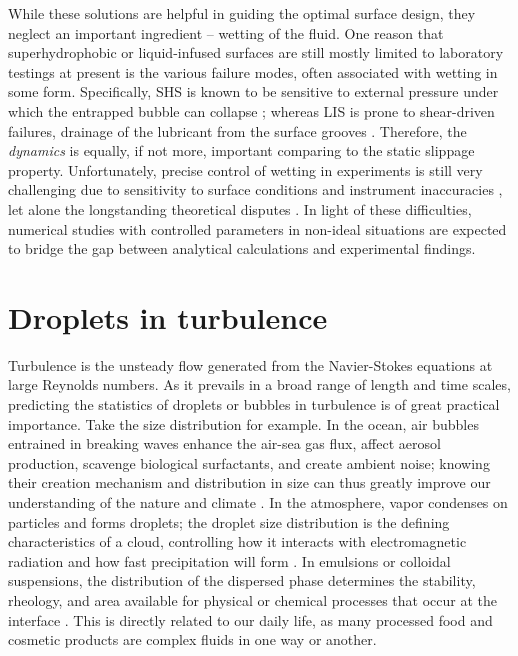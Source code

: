 While these solutions are helpful in guiding the optimal surface design, they neglect an important ingredient -- wetting of the fluid.
One reason that superhydrophobic or liquid-infused surfaces are still mostly limited to laboratory testings at present is the various failure modes, often associated with wetting in some form.
Specifically, SHS is known to be sensitive to external pressure under which the entrapped bubble can collapse \citep{Bocquet}; whereas LIS is prone to shear-driven failures, \ie drainage of the lubricant from the surface grooves \citep{Wexler}.
Therefore, the \emph{dynamics} is equally, if not more, important comparing to the static slippage property.
Unfortunately, precise control of wetting in experiments is still very challenging due to sensitivity to surface conditions and instrument inaccuracies \citep{Liu_vuckovac_etal_2019}, let alone the longstanding theoretical disputes \citep{deGennes_wetting}.
In light of these difficulties, numerical studies with controlled parameters in non-ideal situations are expected to bridge the gap between analytical calculations and experimental findings.


\section{Droplets in turbulence}

Turbulence is the unsteady flow generated from the Navier-Stokes equations at large Reynolds numbers.
As it prevails in a broad range of length and time scales, predicting the statistics of droplets or bubbles in turbulence is of great practical importance.
Take the size distribution for example.
In the ocean, air bubbles entrained in breaking waves enhance the air-sea gas flux, affect aerosol production, scavenge biological surfactants, and create ambient noise; knowing their creation mechanism and distribution in size can thus greatly improve our understanding of the nature and climate \citep{deane_stokes_2002a}.
In the atmosphere, vapor condenses on particles and forms droplets; the droplet size distribution is the defining characteristics of a cloud, controlling how it interacts with electromagnetic radiation and how fast precipitation will form \citep{Shaw_2003}.
In emulsions or colloidal suspensions, the distribution of the dispersed phase determines the stability, rheology, and area available for physical or chemical processes that occur at the interface \citep{boxall_etal_2012}. This is directly related to our daily life, as many processed food and cosmetic products are complex fluids in one way or another.

